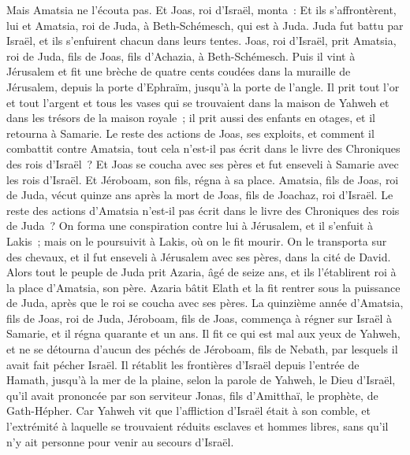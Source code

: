 \begin{multicols}{2}
Mais Amatsia ne l'écouta pas. Et Joas, roi d'Israël, monta~: Et ils s'affrontèrent, lui et Amatsia, roi de Juda, à Beth-Schémesch, qui est à Juda.
Juda fut battu par Israël, et ils s'enfuirent chacun dans leurs tentes.
Joas, roi d'Israël, prit Amatsia, roi de Juda, fils de Joas, fils d'Achazia, à Beth-Schémesch. Puis il vint à Jérusalem et fit une brèche de quatre cents coudées dans la muraille de Jérusalem, depuis la porte d'Ephraïm, jusqu'à la porte de l'angle.
Il prit tout l'or et tout l'argent et tous les vases qui se trouvaient dans la maison de Yahweh et dans les trésors de la maison royale~; il prit aussi des enfants en otages, et il retourna à Samarie.
Le reste des actions de Joas, ses exploits, et comment il combattit contre Amatsia, tout cela n'est-il pas écrit dans le livre des Chroniques des rois d'Israël~?
Et Joas se coucha avec ses pères et fut enseveli à Samarie avec les rois d'Israël. Et Jéroboam, son fils, régna à sa place.
Amatsia, fils de Joas, roi de Juda, vécut quinze ans après la mort de Joas, fils de Joachaz, roi d'Israël.
Le reste des actions d'Amatsia n'est-il pas écrit dans le livre des Chroniques des rois de Juda~?
On forma une conspiration contre lui à Jérusalem, et il s'enfuit à Lakis~; mais on le poursuivit à Lakis, où on le fit mourir.
On le transporta sur des chevaux, et il fut enseveli à Jérusalem avec ses pères, dans la cité de David.
Alors tout le peuple de Juda prit Azaria, âgé de seize ans, et ils l'établirent roi à la place d'Amatsia, son père.
Azaria bâtit Elath et la fit rentrer sous la puissance de Juda, après que le roi se coucha avec ses pères.
La quinzième année d'Amatsia, fils de Joas, roi de Juda, Jéroboam, fils de Joas, commença à régner sur Israël à Samarie, et il régna quarante et un ans.
Il fit ce qui est mal aux yeux de Yahweh, et ne se détourna d'aucun des péchés de Jéroboam, fils de Nebath, par lesquels il avait fait pécher Israël.
Il rétablit les frontières d'Israël depuis l'entrée de Hamath, jusqu'à la mer de la plaine, selon la parole de Yahweh, le Dieu d'Israël, qu'il avait prononcée par son serviteur Jonas, fils d'Amitthaï, le prophète, de Gath-Hépher.
Car Yahweh vit que l'affliction d'Israël était à son comble, et l'extrémité à laquelle se trouvaient réduits esclaves et hommes libres, sans qu'il n'y ait personne pour venir au secours d'Israël.

\end{multicols}
